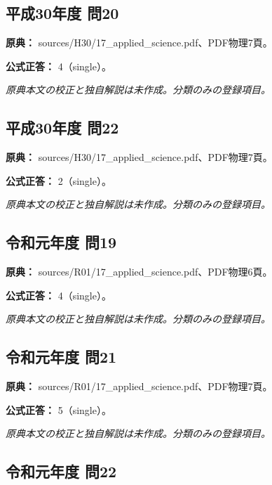\subsection{平成30年度 問20}
\label{q:h30-reg-applied-20}

\noindent\textbf{原典：} sources/H30/17\_applied\_science.pdf、PDF物理7頁。

\textbf{公式正答：} 4（single）。

\par\textit{原典本文の校正と独自解説は未作成。分類のみの登録項目。}

\subsection{平成30年度 問22}
\label{q:h30-reg-applied-22}

\noindent\textbf{原典：} sources/H30/17\_applied\_science.pdf、PDF物理7頁。

\textbf{公式正答：} 2（single）。

\par\textit{原典本文の校正と独自解説は未作成。分類のみの登録項目。}

\subsection{令和元年度 問19}
\label{q:r01-reg-applied-19}

\noindent\textbf{原典：} sources/R01/17\_applied\_science.pdf、PDF物理6頁。

\textbf{公式正答：} 4（single）。

\par\textit{原典本文の校正と独自解説は未作成。分類のみの登録項目。}

\subsection{令和元年度 問21}
\label{q:r01-reg-applied-21}

\noindent\textbf{原典：} sources/R01/17\_applied\_science.pdf、PDF物理7頁。

\textbf{公式正答：} 5（single）。

\par\textit{原典本文の校正と独自解説は未作成。分類のみの登録項目。}

\subsection{令和元年度 問22}
\label{q:r01-reg-applied-22}

